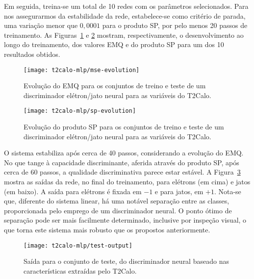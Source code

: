 Em seguida, treina-se um total de 10 redes com os parâmetros
selecionados. Para nos assegurarmos da estabilidade da rede, estabelece-se
como critério de parada, uma variação menor que $0,0001$ para o produto SP,
por pelo menos 20 passos de treinamento. As
Figuras~\ref{fig:best-t2calo-mlp-mse} e \ref{fig:best-t2calo-mlp-sp} mostram,
respectivamente, o desenvolvimento ao longo do treinamento, dos valores EMQ e
do produto SP para um dos 10 resultados obtidos.

\begin{figure}
\begin{center}
\texttt{[image: t2calo-mlp/mse-evolution]}
\end{center}
\caption{Evolução do EMQ para os conjuntos de treino e teste de um
discriminador elétron/jato neural para as variáveis do T2Calo.}
\label{fig:best-t2calo-mlp-mse}
\end{figure}

\begin{figure}
\begin{center}
\texttt{[image: t2calo-mlp/sp-evolution]}
\end{center}
\caption{Evolução do produto SP para os conjuntos de treino e teste de um
discriminador elétron/jato neural para as variáveis do T2Calo.}
\label{fig:best-t2calo-mlp-sp}
\end{figure}

O sistema estabiliza após cerca de 40 passos, considerando a evolução do
EMQ. No que tange à capacidade discriminante, aferida através do produto SP,
após cerca de 60 passos, a qualidade discriminativa parece estar estável. A
Figura~\ref{fig:best-t2calo-mlp-output} mostra as saídas da rede, no final do
treinamento, para elétrons (em cima) e jatos (em baixo). A saída para elétrons
é fixada em $-1$ e para jatos, em $+1$. Nota-se que, diferente do sistema
linear, há uma notável separação entre as classes, proporcionada pelo emprego
de um discriminador neural. O ponto ótimo de separação pode ser mais
facilmente determinado, inclusive por inspeção visual, o que torna este sistema
mais robusto que os propostos anteriormente.

\begin{figure}
\begin{center}
\texttt{[image: t2calo-mlp/test-output]}
\end{center}
\caption{Saída para o conjunto de teste, do discriminador neural baseado nas
características extraídas pelo T2Calo.}
\label{fig:best-t2calo-mlp-output}
\end{figure}

